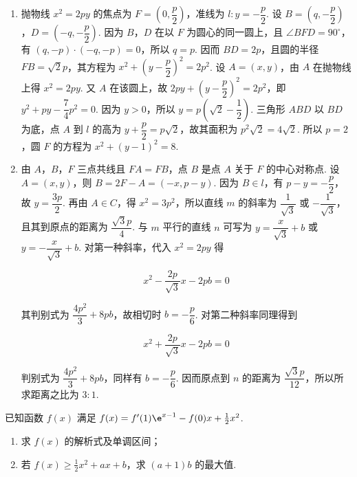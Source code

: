 \begin{solution}
\begin{enumerate}
\item 抛物线 \(x^2=2py\) 的焦点为 \(F=(0,\dfrac p2)\)，准线为 \(l:y=-\dfrac p2\). 设 \(B=(q,-\dfrac p2)\)，\(D=(-q,-\dfrac p2)\). 因为 \(B\)，\(D\) 在以 \(F\) 为圆心的同一圆上，且 \(\angle BFD=90^\circ\)，有 \((q,-p)\cdot(-q,-p)=0\)，所以 \(q=p\). 因而 \(BD=2p\)，且圆的半径 \(FB=\sqrt2p\)，其方程为 \(x^2+\left(y-\dfrac p2\right)^2=2p^2\). 设 \(A=(x,y)\)，由 \(A\) 在抛物线上得 \(x^2=2py\). 又 \(A\) 在该圆上，故 \(2py+\left(y-\dfrac p2\right)^2=2p^2\)，即 \(y^2+py-\dfrac74p^2=0\). 因为 \(y>0\)，所以 \(y=p\left(\sqrt2-\dfrac12\right)\). 三角形 \(ABD\) 以 \(BD\) 为底，点 \(A\) 到 \(l\) 的高为 \(y+\dfrac p2=p\sqrt2\)，故其面积为 \(p^2\sqrt2=4\sqrt2\). 所以 \(p=2\)，圆 \(F\) 的方程为 \(x^2+(y-1)^2=8\).
\item 由 \(A\)，\(B\)，\(F\) 三点共线且 \(FA=FB\)，点 \(B\) 是点 \(A\) 关于 \(F\) 的中心对称点. 设 \(A=(x,y)\)，则 \(B=2F-A=(-x,p-y)\). 因为 \(B\in l\)，有 \(p-y=-\dfrac p2\)，故 \(y=\dfrac{3p}{2}\). 再由 \(A\in C\)，得 \(x^2=3p^2\)，所以直线 \(m\) 的斜率为 \(\dfrac1{\sqrt3}\) 或 \(-\dfrac1{\sqrt3}\)，且其到原点的距离为 \(\dfrac{\sqrt3p}{4}\). 与 \(m\) 平行的直线 \(n\) 可写为 \(y=\dfrac{x}{\sqrt3}+b\) 或 \(y=-\dfrac{x}{\sqrt3}+b\). 对第一种斜率，代入 \(x^2=2py\) 得

\[
x^2-\frac{2p}{\sqrt3}x-2pb=0
\]

其判别式为 \(\dfrac{4p^2}{3}+8pb\)，故相切时 \(b=-\dfrac p6\). 对第二种斜率同理得到

\[
x^2+\frac{2p}{\sqrt3}x-2pb=0
\]

判别式为 \(\dfrac{4p^2}{3}+8pb\)，同样有 \(b=-\dfrac p6\). 因而原点到 \(n\) 的距离为 \(\dfrac{\sqrt3p}{12}\)，所以所求距离之比为 \(3:1\).
\end{enumerate}
\end{solution}

\begin{problem}
已知函数 \(f(x)\) 满足 \(f(x) = f'(1)\e^{x-1} - f(0)x + \frac{1}{2}x^2\).

\begin{enumerate}
\item 求 \(f(x)\) 的解析式及单调区间；
\item 若 \(f(x) \geqslant \frac{1}{2}x^2 + ax + b\)，求 \((a + 1)b\) 的最大值.
\end{enumerate}
\end{problem}

